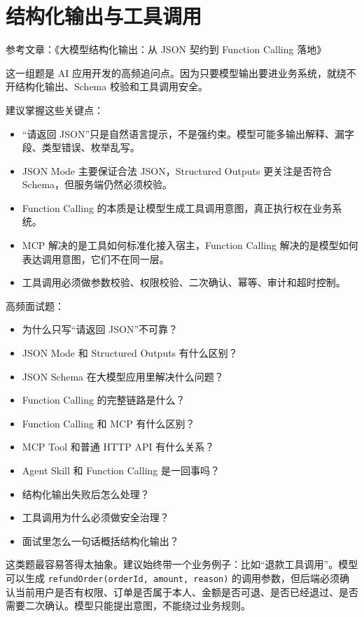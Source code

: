 \documentclass[9pt,a4paper,twocolumn]{ctexart}
\begin{document}
\section*{结构化输出与工具调用}


参考文章：《大模型结构化输出：从 JSON 契约到 Function Calling 落地》



这一组题是 AI 应用开发的高频追问点。因为只要模型输出要进业务系统，就绕不开结构化输出、Schema 校验和工具调用安全。



建议掌握这些关键点：


\begin{itemize}[itemsep=1pt, topsep=2pt]
  \item “请返回 JSON”只是自然语言提示，不是强约束。模型可能多输出解释、漏字段、类型错误、枚举乱写。
  \item JSON Mode 主要保证合法 JSON，Structured Outputs 更关注是否符合 Schema，但服务端仍然必须校验。
  \item Function Calling 的本质是让模型生成工具调用意图，真正执行权在业务系统。
  \item MCP 解决的是工具如何标准化接入宿主，Function Calling 解决的是模型如何表达调用意图，它们不在同一层。
  \item 工具调用必须做参数校验、权限校验、二次确认、幂等、审计和超时控制。
\end{itemize}


高频面试题：


\begin{itemize}[itemsep=1pt, topsep=2pt]
  \item 为什么只写“请返回 JSON”不可靠？
  \item JSON Mode 和 Structured Outputs 有什么区别？
  \item JSON Schema 在大模型应用里解决什么问题？
  \item Function Calling 的完整链路是什么？
  \item Function Calling 和 MCP 有什么区别？
  \item MCP Tool 和普通 HTTP API 有什么关系？
  \item Agent Skill 和 Function Calling 是一回事吗？
  \item 结构化输出失败后怎么处理？
  \item 工具调用为什么必须做安全治理？
  \item 面试里怎么一句话概括结构化输出？
\end{itemize}


这类题最容易答得太抽象。建议始终带一个业务例子：比如“退款工具调用”。模型可以生成 \texttt{refundOrder(orderId, amount, reason)} 的调用参数，但后端必须确认当前用户是否有权限、订单是否属于本人、金额是否可退、是否已经退过、是否需要二次确认。模型只能提出意图，不能绕过业务规则。
\end{document}
